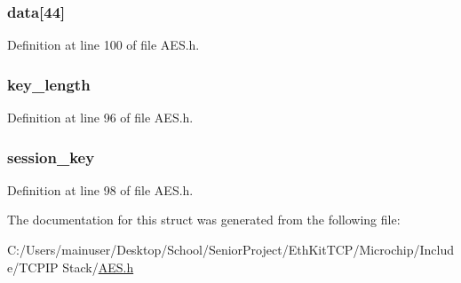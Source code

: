 \subsubsection[{data}]{ data\mbox{[}44\mbox{]}}\label{struct_a_e_s___r_o_u_n_d___k_e_y_s__128___b_i_t_a5430c5f7549b0972e66f824e048964aa}


Definition at line 100 of file A\+E\+S.\+h.

\hypertarget{struct_a_e_s___r_o_u_n_d___k_e_y_s__128___b_i_t_aa42d871fcd1183159392e19781181b56}{}
\subsubsection[{key\+\_\+length}]{ key\+\_\+length}\label{struct_a_e_s___r_o_u_n_d___k_e_y_s__128___b_i_t_aa42d871fcd1183159392e19781181b56}


Definition at line 96 of file A\+E\+S.\+h.

\hypertarget{struct_a_e_s___r_o_u_n_d___k_e_y_s__128___b_i_t_a8188e88d5ecaef25564a4afaaf888573}{}
\subsubsection[{session\+\_\+key}]{ session\+\_\+key}\label{struct_a_e_s___r_o_u_n_d___k_e_y_s__128___b_i_t_a8188e88d5ecaef25564a4afaaf888573}


Definition at line 98 of file A\+E\+S.\+h.



The documentation for this struct was generated from the following file\+:\begin{DoxyCompactItemize}
\item 
C\+:/\+Users/mainuser/\+Desktop/\+School/\+Senior\+Project/\+Eth\+Kit\+T\+C\+P/\+Microchip/\+Include/\+T\+C\+P\+I\+P Stack/\hyperlink{_a_e_s_8h}{A\+E\+S.\+h}\end{DoxyCompactItemize}

